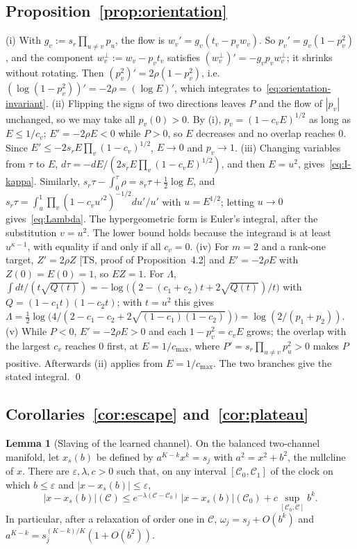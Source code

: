 \documentclass[11pt]{article}
\newcommand{\TS}{\textsf{TS}}
\newcommand{\ts}[1]{[\TS, #1]}
\newcommand{\Clk}{\mathcal{C}}
\theoremstyle{definition}
\newtheorem{lemma}[theorem]{Lemma}
\numberwithin{equation}{section}
\begin{document}
\subsection{Proposition~\ref{prop:orientation}}\label{app:orientation}

(i) With $g_v:=s_r\prod_{u\neq v}p_u$, the flow is $w_v'=g_v(t_v-p_vw_v)$. So $p_v'=g_v(1-p_v^2)$, and the component $w_v^\perp:=w_v-p_vt_v$ satisfies $(w_v^\perp)'=-g_vp_vw_v^\perp$; it shrinks without rotating. Then $(p_v^2)'=2\rho(1-p_v^2)$, i.e.\ $(\log(1-p_v^2))'=-2\rho=(\log E)'$, which integrates to~\eqref{eq:orientation-invariant}.
(ii) Flipping the signs of two directions leaves $P$ and the flow of $|p_v|$ unchanged, so we may take all $p_v(0)>0$. By (i), $p_v=(1-c_vE)^{1/2}$ as long as $E\le1/c_v$; $E'=-2\rho E<0$ while $P>0$, so $E$ decreases and no overlap reaches $0$. Since $E'\le-2s_rE\prod_v(1-c_v)^{1/2}$, $E\to0$ and $p_v\to1$.
(iii) Changing variables from $\tau$ to $E$, $d\tau=-dE/(2s_rE\prod_v(1-c_vE)^{1/2})$, and then $E=u^2$, gives~\eqref{eq:I-kappa}. Similarly, $s_r\tau-\int_0^\tau\rho=s_r\tau+\tfrac12\log E$, and $s_r\tau=\int_{u}^1\prod_v(1-c_vu'^2)^{-1/2}du'/u'$ with $u=E^{1/2}$; letting $u\to0$ gives~\eqref{eq:Lambda}. The hypergeometric form is Euler's integral, after the substitution $v=u^2$. The lower bound holds because the integrand is at least $u^{\kappa-1}$, with equality if and only if all $c_v=0$.
(iv) For $m=2$ and a rank-one target, $Z'=2\rho Z$ \ts{proof of Proposition~4.2} and $E'=-2\rho E$ with $Z(0)=E(0)=1$, so $EZ=1$. For $\Lambda$, $\int dt/(t\sqrt{Q(t)})=-\log\big((2-(c_1+c_2)t+2\sqrt{Q(t)})/t\big)$ with $Q=(1-c_1t)(1-c_2t)$; with $t=u^2$ this gives $\Lambda=\tfrac12\log\big(4/(2-c_1-c_2+2\sqrt{(1-c_1)(1-c_2)})\big)=\log(2/(p_1+p_2))$.
(v) While $P<0$, $E'=-2\rho E>0$ and each $1-p_v^2=c_vE$ grows; the overlap with the largest $c_v$ reaches $0$ first, at $E=1/c_{\max}$, where $P'=s_r\prod_{u\neq v}p_u^2>0$ makes $P$ positive. Afterwards (ii) applies from $E=1/c_{\max}$. The two branches give the stated integral. \qed

\subsection{Corollaries~\ref{cor:escape} and~\ref{cor:plateau}}\label{app:escape}

\begin{lemma}[Slaving of the learned channel]\label{lem:slaving}
On the balanced two-channel manifold, let $x_s(b)$ be defined by $a^{K-k}x^k=s_j$ with $a^2=x^2+b^2$, the nullcline of $x$. There are $\varepsilon,\lambda,c>0$ such that, on any interval $[\Clk_0,\Clk_1]$ of the clock on which $b\le\varepsilon$ and $|x-x_s(b)|\le\varepsilon$,
\[
|x-x_s(b)|(\Clk)\le e^{-\lambda(\Clk-\Clk_0)}\,|x-x_s(b)|(\Clk_0)+c\sup_{[\Clk_0,\Clk]}b^k.
\]
In particular, after a relaxation of order one in $\Clk$, $\omega_j=s_j+O(b^k)$ and $a^{K-k}=s_j^{(K-k)/K}(1+O(b^2))$.
\end{lemma}
\end{document}
